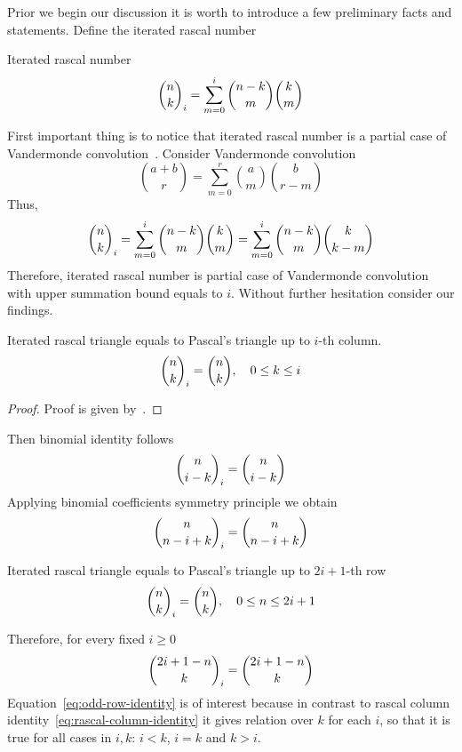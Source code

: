 ﻿Prior we begin our discussion it is worth to introduce a few preliminary facts and statements.
Define the iterated rascal number
\begin{definition}
    Iterated rascal number~\cite{gregory2023iterated}
    \begin{align}
        \binom{n}{k}_{i} = \sum_{m=0}^{i} \binom{n-k}{m} \binom{k}{m}
    \end{align}
\end{definition}
First important thing is to notice that iterated rascal number
is a partial case of Vandermonde convolution~\cite{andrews1999special}.
Consider Vandermonde convolution
\begin{equation*}
    \binom{a+b}{r} = \sum_{m=0}^{r} \binom{a}{m} \binom{b}{r-m}
\end{equation*}
Thus,
\begin{equation}
    \binom{n}{k}_{i} = \sum_{m=0}^{i} \binom{n-k}{m} \binom{k}{m} = \sum_{m=0}^{i} \binom{n-k}{m} \binom{k}{k-m}
    \label{eq:rascal-vandermonde-convolution}
\end{equation}
Therefore, iterated rascal number is partial case of Vandermonde convolution with upper summation bound equals to $i$.
Without further hesitation consider our findings.
\begin{proposition}
    Iterated rascal triangle equals to Pascal's triangle up to $i$-th column.
    \begin{equation}
        \binom{n}{k}_{i} = \binom{n}{k}, \quad 0 \leq k \leq i\label{eq:rascal-column-identity}
    \end{equation}
    \begin{proof}
        Proof is given by~\cite{gregory2023iterated}.
    \end{proof}
\end{proposition}
Then binomial identity follows
\begin{align*}
    \binom{n}{i-k}_{i} = \binom{n}{i-k}
\end{align*}
Applying binomial coefficients symmetry principle we obtain
\begin{align*}
    \binom{n}{n-i+k}_{i} = \binom{n}{n-i+k}
\end{align*}
\begin{proposition}
    \label{prop:odd-row-proposition}
    Iterated rascal triangle equals to Pascal's triangle up to $2i+1$-th row
    \begin{align*}
        \binom{n}{k}_{i} = \binom{n}{k}, \quad 0 \leq n \leq 2i+1
    \end{align*}
\end{proposition}
Therefore, for every fixed $i \geq 0$
\begin{equation}
    \binom{2i+1-n}{k}_{i} = \binom{2i+1-n}{k}
    \label{eq:odd-row-identity}
\end{equation}
Equation~\eqref{eq:odd-row-identity} is of interest because in contrast to rascal
column identity~\eqref{eq:rascal-column-identity} it gives relation over $k$ for each $i$,
so that it is true for all cases in $i,k$: $i < k$, $i=k$ and $k >i$.

